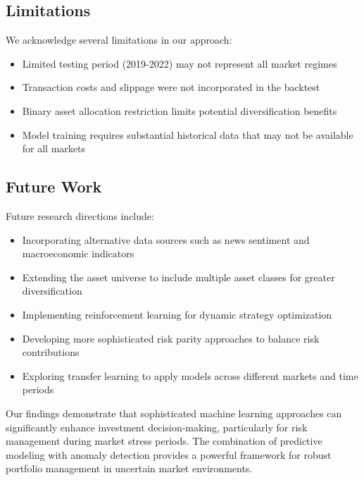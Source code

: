 \documentclass[10pt]{article}
\begin{document}
\subsection{Limitations}
We acknowledge several limitations in our approach:

\begin{itemize}
	\item Limited testing period (2019-2022) may not represent all market regimes
	\item Transaction costs and slippage were not incorporated in the backtest
	\item Binary asset allocation restriction limits potential diversification benefits
	\item Model training requires substantial historical data that may not be available for all markets
\end{itemize}

\subsection{Future Work}
Future research directions include:

\begin{itemize}
	\item Incorporating alternative data sources such as news sentiment and macroeconomic indicators
	\item Extending the asset universe to include multiple asset classes for greater diversification
	\item Implementing reinforcement learning for dynamic strategy optimization
	\item Developing more sophisticated risk parity approaches to balance risk contributions
	\item Exploring transfer learning to apply models across different markets and time periods
\end{itemize}

Our findings demonstrate that sophisticated machine learning approaches can significantly enhance investment decision-making, particularly for risk management during market stress periods. The combination of predictive modeling with anomaly detection provides a powerful framework for robust portfolio management in uncertain market environments.



\end{document}

